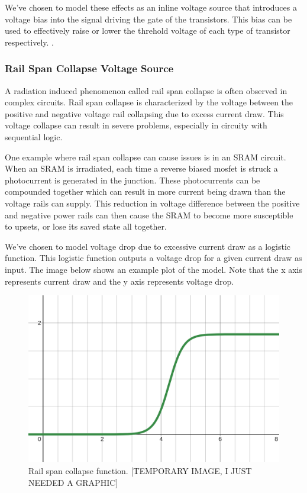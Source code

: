\documentclass[conference]{IEEEtran}
\begin{document}
We've chosen to model these effects as an inline voltage source that introduces a voltage bias into the signal driving the gate of the transistors. This bias can be used to effectively raise or lower the threhold voltage of each type of transistor respectively.
\cite{Pepper1990}.

\vspace{1em}
\subsubsection{Rail Span Collapse Voltage Source}
A radiation induced phenomenon called rail span collapse is often observed in complex circuits. Rail span collapse is characterized by the voltage between the positive and negative voltage rail collapsing due to excess current draw. This voltage collapse can result in severe problems, especially in circuity with sequential logic.

One example where rail span collapse can cause issues is in an SRAM circuit. When an SRAM is irradiated, each time a reverse biased mosfet is struck a photocurrent is generated in the junction. These photocurrents can be compounded together which can result in more current being drawn than the voltage rails can supply. This reduction in voltage difference between the positive and negative power rails can then cause the SRAM to become more susceptible to upsets, or lose its saved state all together. 

We've chosen to model voltage drop due to excessive current draw as a logistic function. This logistic function outputs a voltage drop for a given current draw as input. The image below shows an example plot of the model. Note that the x axis represents current draw and the y axis represents voltage drop.

\begin{figure}[htbp]
\centering
\includegraphics[width=0.9\linewidth]{rail_collapse_function.png}
\caption{Rail span collapse function. [TEMPORARY IMAGE, I JUST NEEDED A GRAPHIC]}
\label{fig:rail_collapse_function}
\end{figure}
\end{document}
